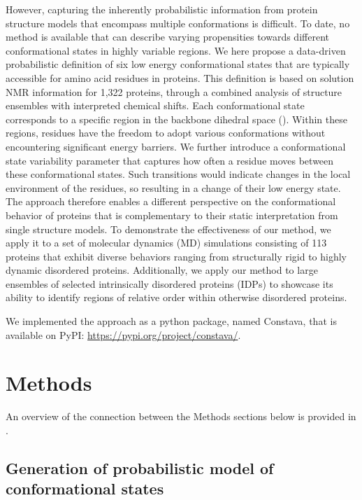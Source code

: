 However, capturing the inherently probabilistic information from protein structure models that encompass multiple conformations is difficult. To date, no method is available that can describe varying propensities towards different conformational states in highly variable regions. We here propose a data-driven probabilistic definition of six low energy conformational states that are typically accessible for amino acid residues in proteins. This definition is based on solution NMR information for 1,322 proteins, through a combined analysis of structure ensembles with interpreted chemical shifts. Each conformational state corresponds to a specific region in the backbone dihedral space (). Within these regions, residues have the freedom to adopt various conformations without encountering significant energy barriers. We further introduce a conformational state variability parameter that captures how often a residue moves between these conformational states. Such transitions would indicate changes in the local environment of the residues, so resulting in a change of their low energy state. The approach therefore enables a different perspective on the conformational behavior of proteins that is complementary to their static interpretation from single structure models. To demonstrate the effectiveness of our method, we apply it to a set of molecular dynamics (MD) simulations consisting of 113 proteins that exhibit diverse behaviors ranging from structurally rigid to highly dynamic disordered proteins. Additionally, we apply our method to large ensembles of selected intrinsically disordered proteins (IDPs) to showcase its ability to identify regions of relative order within otherwise disordered proteins.

We implemented the approach as a python package, named Constava, that is available on PyPI: \url{https://pypi.org/project/constava/}.

\section{Methods}

An overview of the connection between the Methods sections below is provided in . 

\subsection{Generation of probabilistic model of conformational states} \label{definition_conf_states}


